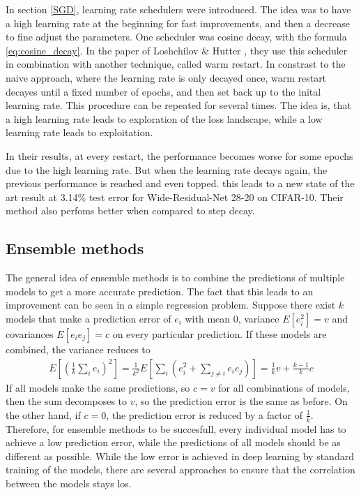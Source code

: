 In section \ref{SGD}, learning rate schedulers were introduced. The idea was to
have a high learning rate at the beginning for fast improvements, and then a
decrease to fine adjust the parameters. One scheduler was cosine decay, with the
formula \ref{eq:cosine_decay}. In the paper of Loshchilov \& Hutter
\cite{loshchilov2016sgdr}, they use this scheduler in combination with another
technique, called warm restart. In constrast to the naive approach, where the
learning rate is only decayed once, warm restart decayes until a fixed number of
epochs, and then set back up to the inital learning rate. This procedure can be
repeated for several times. The idea is, that a high learning rate leads to
exploration of the loss landscape, while a low learning rate leads to
exploitation.

In their results, at every restart, the performance becomes worse for some
epochs due to the high learning rate. But when the learning rate decays again, the
previous performance is reached and even topped. this leads to a new state of
the art result at 3.14\% test error for Wide-Residual-Net 28-20 on CIFAR-10.
Their method also perfoms better when compared to step decay. 


\subsection{Ensemble methods}\label{sub:Ensemble_Methods}
The general idea of ensemble methods is to combine the predictions of multiple
models to get a more accurate prediction. The fact that this leads to an
improvement can be seen in a simple regression problem. Suppose there exist $k$
models that make a prediction error of $e_i$ with mean 0, variance $E[e_i^2]=v$ and
covariances $E[e_i e_j]=c$ on every particular prediction. If these models are
combined, the variance reduces to 
\begin{align}
    E[(\frac{1}{k} \sum_i e_i)^2]=\frac{1}{k^2}E[\sum_i (e_i^2 + \sum_{j\neq i} e_i e_j)]=\frac{1}{k}v+\frac{k-1}{k}c
\end{align}
If all models make the same predictions, so $c=v$ for all combinations of
models, then the sum decomposes to $v$, so the prediction error is the same as
before. On the other hand, if $c=0$, the prediction error is reduced by a factor
of $\frac{1}{k}$. Therefore, for ensemble methods to be succesfull, every individual model
has to achieve a low prediction error, while the predictions of all models
should be as different as possible. While the low error is achieved in deep
learning by standard training of the models, there are several approaches to
ensure that the correlation between the models stays los.

